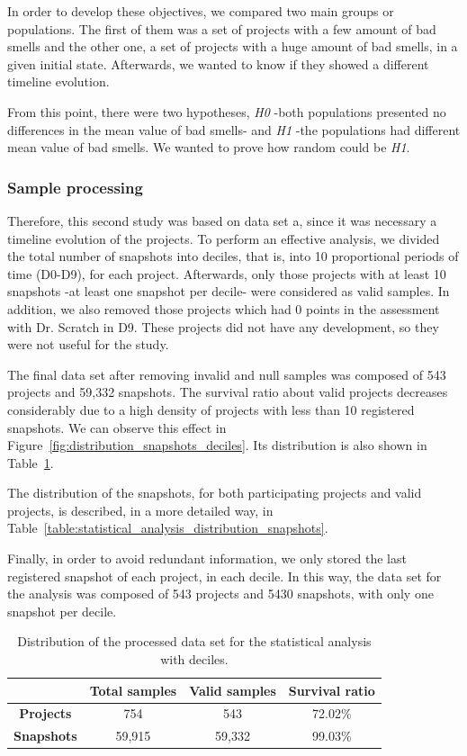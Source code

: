 In order to develop these objectives, we compared two main groups or populations. The first of them was a set of projects with a few amount of bad smells and the other one, a set of projects with a huge amount of bad smells, in a given initial state. Afterwards, we wanted to know if they showed a different timeline evolution.

From this point, there were two hypotheses, \textit{H0} -both populations presented no differences in the mean value of bad smells- and \textit{H1} -the populations had different mean value of bad smells. We wanted to prove how random could be \textit{H1}.   


\subsubsection{Sample processing}
\label{subsubsec:sample_processing}

Therefore, this second study was based on data set a, since it was necessary a timeline evolution of the projects. To perform an effective analysis, we divided the total number of snapshots into deciles, that is, into 10 proportional periods of time (D0-D9), for each project. Afterwards, only those projects with at least 10 snapshots -at least one snapshot per decile- were considered as valid samples. In addition, we also removed those projects which had 0 points in the assessment with Dr. Scratch in D9. These projects did not have any development, so they were not useful for the study. 

The final data set after removing invalid and null samples was composed of 543 projects and 59,332 snapshots. The survival ratio about valid projects decreases considerably due to a high density of projects with less than 10 registered snapshots. We can observe this effect in Figure~\ref{fig:distribution_snapshots_deciles}. Its distribution is also shown in Table~\ref{table:statistical_analysis_distribution_samples}. 

The distribution of the snapshots, for both participating projects and valid projects, is described, in a more detailed way, in Table~\ref{table:statistical_analysis_distribution_snapshots}.

Finally, in order to avoid redundant information, we only stored the last registered snapshot of each project, in each decile. In this way, the data set for the analysis was composed of 543 projects and 5430 snapshots, with only one snapshot per decile.


\begin{table}
    \centering
    \begin{tabular}{|c|c|c|c|}
        \hline
        & \textbf{Total samples} & \textbf{Valid samples} & \textbf{Survival ratio} \\ \hline
        \textbf{Projects} & 754 & 543 & 72.02\% \\ \hline
        \textbf{Snapshots} & 59,915 & 59,332 & 99.03\% \\ \hline
    \end{tabular}
    \caption{Distribution of the processed data set for the statistical analysis with deciles.}
    \label{table:statistical_analysis_distribution_samples}
\end{table}

